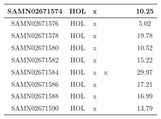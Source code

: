 \documentclass[../main.tex]{subfiles}
\begin{document}
\begin{flushleft}
\begin{footnotesize}
\begin{longtable}{|c|c|c|c|c|c|c|}
    \hline
    SAMN02671574  & HOL   & x                                                            & ~          & ~                                                                           & ~                                                                 & 10.25     \\ 
    \hline
    SAMN02671576  & HOL   & x                                                            & ~          & ~                                                                           & ~                                                                 & 5.02      \\ 
    \hline
    SAMN02671578  & HOL   & x                                                            & ~          & ~                                                                           & ~                                                                 & 19.78     \\ 
    \hline
    SAMN02671580  & HOL   & x                                                            & ~          & ~                                                                           & ~                                                                 & 10.52     \\ 
    \hline
    SAMN02671582  & HOL   & x                                                            & ~          & ~                                                                           & ~                                                                 & 15.22     \\ 
    \hline
    SAMN02671584  & HOL   & x                                                            & x          & ~                                                                           & ~                                                                 & 29.97     \\ 
    \hline
    SAMN02671586  & HOL   & x                                                            & ~          & ~                                                                           & ~                                                                 & 17.21     \\ 
    \hline
    SAMN02671588  & HOL   & x                                                            & ~          & ~                                                                           & ~                                                                 & 16.99     \\ 
    \hline
    SAMN02671590  & HOL   & x                                                            & ~          & ~                                                                           & ~                                                                 & 13.79     \\ 

\end{longtable}
\end{footnotesize}
\end{flushleft}
\end{document}
